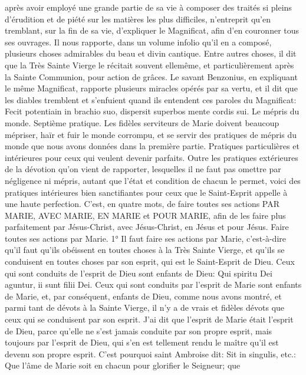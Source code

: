 après avoir employé une grande partie de sa vie à composer des traités si pleins d'érudition et de piété sur les
matières les plus difficiles, n'entreprit qu'en tremblant, sur la fin de sa vie, d'expliquer le Magnificat, afin d'en
couronner tous ses ouvrages. Il nous rapporte, dans un volume infolio qu'il en a composé, plusieurs choses
admirables du beau et divin cantique. Entre autres choses, il dit que la Très Sainte Vierge le récitait souvent ellemême, et particulièrement après la Sainte Communion, pour action de grâces. Le savant Benzonius, en expliquant
le même Magnificat, rapporte plusieurs miracles opérés par sa vertu, et il dit que les diables tremblent et s'enfuient
quand ils entendent ces paroles du Magnificat: Fecit potentiain in brachio suo, dispersit superbos mente cordis sui.
Le mépris du monde.
 Septième pratique. Les fidèles serviteurs de Marie doivent beaucoup mépriser, haïr et fuir le monde
corrompu, et se servir des pratiques de mépris du monde que nous avons données dans la première partie.
Pratiques particulières et intérieures
pour ceux qui veulent devenir parfaits.
 Outre les pratiques extérieures de la dévotion qu'on vient de rapporter, lesquelles il ne faut pas omettre par
négligence ni mépris, autant que l'état et condition de chacun le permet, voici des pratiques intérieures bien
sanctifiantes pour ceux que le Saint-Esprit appelle à une haute perfection.
C'est, en quatre mots, de faire toutes ses actions PAR MARIE, AVEC MARIE, EN MARIE et POUR MARIE, afin de
les faire plus parfaitement par Jésus-Christ, avec Jésus-Christ, en Jésus et pour Jésus.
Faire toutes ses actions par Marie.
 1° Il faut faire ses actions par Marie, c'est-à-dire qu'il faut qu'ils obéissent en toutes choses à la Très Sainte
Vierge, et qu'ils se conduisent en toutes choses par son esprit, qui est le Saint-Esprit de Dieu. Ceux qui sont
conduits de l'esprit de Dieu sont enfants de Dieu: Qui spiritu Dei aguntur, ii sunt filii Dei. Ceux qui sont conduits par
l'esprit de Marie sont enfants de Marie, et, par conséquent, enfants de Dieu, comme nous avons montré, et parmi
tant de dévots à la Sainte Vierge, il n'y a de vrais et fidèles dévots que ceux qui se conduisent par son esprit. J'ai
dit que l'esprit de Marie était l'esprit de Dieu, parce qu'elle ne s'est jamais conduite par son propre esprit, mais
toujours par l'esprit de Dieu, qui s'en est tellement rendu le maître qu'il est devenu son propre esprit. C'est
pourquoi saint Ambroise dit: Sit in singulis, etc.: Que l'âme de Marie soit en chacun pour glorifier le Seigneur; que
